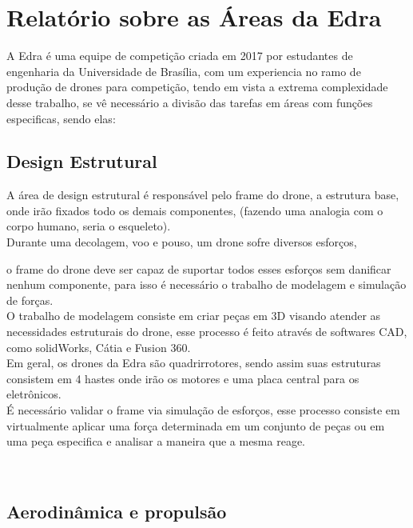 \section{Relatório sobre
as Áreas da Edra}



A Edra é uma equipe de competição criada em 2017 por estudantes de engenharia da Universidade de Brasília, com um experiencia no ramo de produção de drones para competição, tendo em vista a extrema complexidade desse trabalho, se vê necessário a divisão das tarefas em áreas com funções especificas, sendo elas:

\subsection{Design Estrutural}



A área de design estrutural é responsável pelo frame do drone, a estrutura base, onde irão fixados todo os demais componentes, (fazendo uma analogia com o corpo humano, seria o esqueleto).\\[0.2cm]



Durante uma decolagem, voo e pouso, um drone sofre diversos esforços,

o frame do drone deve ser capaz de suportar todos esses esforços sem danificar nenhum componente, para isso é necessário o trabalho de modelagem e simulação de forças.\\[0.2cm]



O trabalho de modelagem consiste em criar peças em 3D visando atender as necessidades estruturais do drone, esse processo é feito através de softwares CAD, como solidWorks, Cátia e Fusion 360.
\\[0.2cm]


Em geral, os drones da Edra são quadrirrotores, sendo assim suas estruturas consistem em 4 hastes onde irão os motores e uma placa central para os eletrônicos.
\\[0.2cm]


É necessário validar o frame via simulação de esforços, esse processo consiste em virtualmente aplicar uma força determinada em um conjunto de peças ou em uma peça especifica e analisar a maneira que a mesma reage.

  \\[0.2cm]

\subsection{Aerodinâmica e propulsão}

